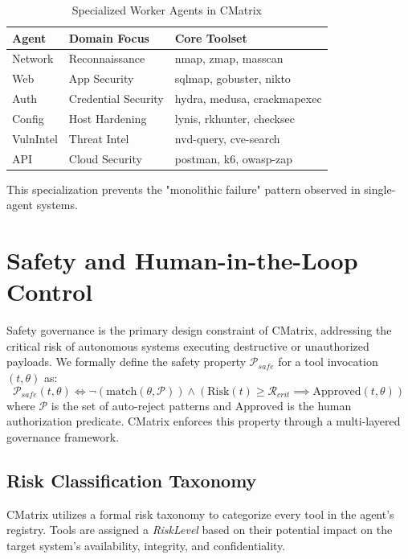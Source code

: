 \documentclass[conference,compsoc]{IEEEtran}
\begin{document}
\begin{table}[htbp]
\centering
\caption{Specialized Worker Agents in CMatrix}
\label{tab:agents}
\begin{tabular}{lll}
\toprule
\textbf{Agent} & \textbf{Domain Focus} & \textbf{Core Toolset} \\
\midrule
Network & Reconnaissance & nmap, zmap, masscan \\
Web & App Security & sqlmap, gobuster, nikto \\
Auth & Credential Security & hydra, medusa, crackmapexec \\
Config & Host Hardening & lynis, rkhunter, checksec \\
VulnIntel & Threat Intel & nvd-query, cve-search \\
API & Cloud Security & postman, k6, owasp-zap \\
\bottomrule
\end{tabular}
\end{table}

This specialization prevents the "monolithic failure" pattern observed in single-agent systems.

\section{Safety and Human-in-the-Loop Control}
Safety governance is the primary design constraint of CMatrix, addressing the critical risk of autonomous systems executing destructive or unauthorized payloads. We formally define the safety property $\mathcal{P}_{safe}$ for a tool invocation $(t, \theta)$ as:
\begin{equation}
\mathcal{P}_{safe}(t, \theta) \iff \neg (\text{match}(\theta, \mathcal{P})) \wedge (\text{Risk}(t) \geq \mathcal{R}_{crit} \implies \text{Approved}(t, \theta))
\end{equation}
where $\mathcal{P}$ is the set of auto-reject patterns and $\text{Approved}$ is the human authorization predicate. CMatrix enforces this property through a multi-layered governance framework.

\subsection{Risk Classification Taxonomy}
CMatrix utilizes a formal risk taxonomy to categorize every tool in the agent's registry. Tools are assigned a \textit{RiskLevel} based on their potential impact on the target system's availability, integrity, and confidentiality.
\end{document}
